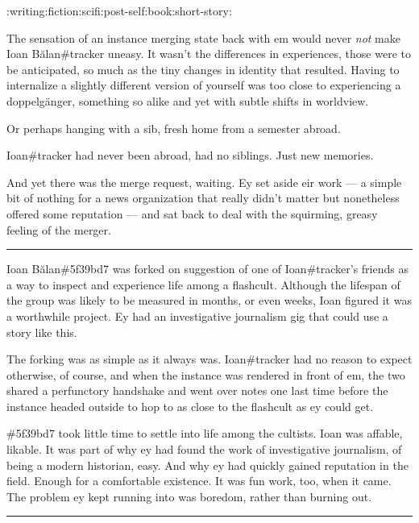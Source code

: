 :writing:fiction:scifi:post-self:book:short-story:

The sensation of an instance merging state back with em would never \emph{not} make Ioan Bălan\#tracker uneasy. It wasn't the differences in experiences, those were to be anticipated, so much as the tiny changes in identity that resulted. Having to internalize a slightly different version of yourself was too close to experiencing a doppelgänger, something so alike and yet with subtle shifts in worldview.

Or perhaps hanging with a sib, fresh home from a semester abroad.

Ioan\#tracker had never been abroad, had no siblings. Just new memories.

And yet there was the merge request, waiting. Ey set aside eir work --- a simple bit of nothing for a news organization that really didn't matter but nonetheless offered some reputation --- and sat back to deal with the squirming, greasy feeling of the merger.

\begin{center}\rule{0.5\linewidth}{\linethickness}\end{center}

Ioan Bălan\#5f39bd7 was forked on suggestion of one of Ioan\#tracker's friends as a way to inspect and experience life among a flashcult. Although the lifespan of the group was likely to be measured in months, or even weeks, Ioan figured it was a worthwhile project. Ey had an investigative journalism gig that could use a story like this.

The forking was as simple as it always was. Ioan\#tracker had no reason to expect otherwise, of course, and when the instance was rendered in front of em, the two shared a perfunctory handshake and went over notes one last time before the instance headed outside to hop to as close to the flashcult as ey could get.

\#5f39bd7 took little time to settle into life among the cultists. Ioan was affable, likable. It was part of why ey had found the work of investigative journalism, of being a modern historian, easy. And why ey had quickly gained reputation in the field. Enough for a comfortable existence. It was fun work, too, when it came. The problem ey kept running into was boredom, rather than burning out.

\begin{center}\rule{0.5\linewidth}{\linethickness}\end{center}

